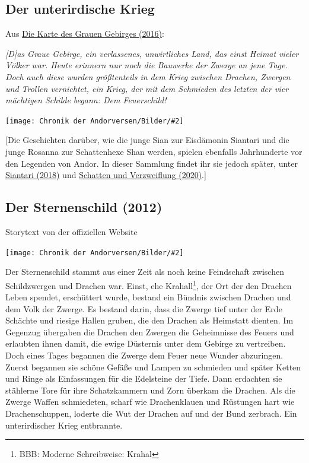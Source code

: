 \documentclass[10pt, a4paper, oneside]{book}
\newcommand{\fillbreak}{\vspace*{\fill}\columnbreak}
\newcommand{\storytext}[1]{%
    \section{#1}%
    \label{Storytext: #1}%
}
\newcommand{\refprodukt}[1]{\hyperref[Produkt: #1]{#1}}
\newcommand{\refstorytext}[1]{\hyperref[Storytext: #1]{#1}}
\newcommand{\bildmitts}[2][height=0.32\textwidth,width=0.48\textwidth,keepaspectratio]{%
    \begin{center}
        \texttt{[image: Chronik der Andorversen/Bilder/\#2]}
    \end{center}
}
\begin{document}
\begin{multicols}{2}

\begin{chapterbox}

    \chapter{Der unterirdische Krieg}
    
    
    
    \begin{center}
        Aus \refprodukt{Die Karte des Grauen Gebirges (2016)}:
    \end{center}
    
    \textit{[D]as Graue Gebirge, ein verlassenes, unwirtliches Land, das einst Heimat vieler Völker war. Heute erinnern nur noch die Bauwerke der Zwerge an jene Tage. Doch auch diese wurden größtenteils in dem Krieg zwischen Drachen, Zwergen und Trollen vernichtet, ein Krieg, der mit dem Schmieden des letzten der vier mächtigen Schilde begann: Dem Feuerschild!}\bigskip
    
    \bildmitts[width=\textwidth]{Kreatok und Nehal.jpeg}
    
    
    [Die Geschichten darüber, wie die junge Sian zur Eisdämonin Siantari und die junge Rosanna zur Schattenhexe Shan werden, spielen ebenfalls Jahrhunderte vor den Legenden von Andor. In dieser Sammlung findet ihr sie jedoch später, unter \refstorytext{Siantari (2018)} und \refstorytext{Schatten und Verzweiflung (2020)}.]

\end{chapterbox}





    

\fillbreak
\storytext{Der Sternenschild (2012)}

\begin{center}
    Storytext von der offiziellen Website
\end{center}

\bildmitts{Der Sternenschild Bild 1.jpg}

Der Sternenschild stammt aus einer Zeit als noch keine Feindschaft zwischen Schildzwergen und Drachen war. Einst, ehe Krahall\footnote{BBB: Moderne Schreibweise: Krahal}, der Ort der den Drachen Leben spendet, erschüttert wurde, bestand ein Bündnis zwischen Drachen und dem Volk der Zwerge. Es bestand darin, dass die Zwerge tief unter der Erde Schächte und riesige Hallen gruben, die den Drachen als Heimstatt dienten. Im Gegenzug übergaben die Drachen den Zwergen die Geheimnisse des Feuers und erlaubten ihnen damit, die ewige Düsternis unter dem Gebirge zu vertreiben. Doch eines Tages begannen die Zwerge dem Feuer neue Wunder abzuringen. Zuerst begannen sie schöne Gefäße und Lampen zu schmieden und später Ketten und Ringe als Einfassungen für die Edelsteine der Tiefe. Dann erdachten sie stählerne Tore für ihre Schatzkammern und Zorn überkam die Drachen. Als die Zwerge Waffen schmiedeten, scharf wie Drachenklauen und Rüstungen hart wie Drachenschuppen, loderte die Wut der Drachen auf und der Bund zerbrach. Ein unterirdischer Krieg entbrannte.\bigskip


\end{multicols}
\end{document}
